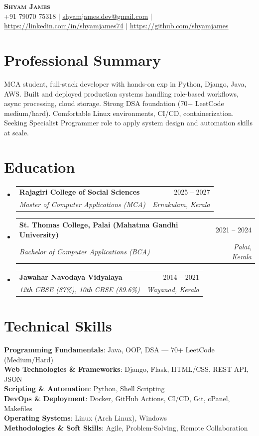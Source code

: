 \documentclass[a4paper,11pt]{article}
\makeatletter
\newcommand{\resumeSubheading}[4]{
  \vspace{-2pt}\item
    \begin{tabular*}{0.97\textwidth}[t]{l@{\extracolsep{\fill}}r}
      \textbf{#1} & #2 \\
      \textit{\small#3} & \textit{\small #4} \\
    \end{tabular*}\vspace{-7pt}
}
\newcommand{\resumeSubHeadingListStart}{\begin{itemize}[leftmargin=0.15in, label={}]}
\newcommand{\resumeSubHeadingListEnd}{\end{itemize}}
\makeatother
\begin{document}
\begin{center}
    \textbf{\Huge \scshape Shyam James} \\ \vspace{5pt}
    \small +91 79070 75318 $|$ \href{mailto:shyamjames.dev@gmail.com}{\underline{shyamjames.dev@gmail.com}} $|$ 
    \href{https://linkedin.com/in/shyamjames74}{\underline{https://linkedin.com/in/shyamjames74}} $|$
    \href{https://github.com/shyamjames}{\underline{https://github.com/shyamjames}}
\end{center}

\section{Professional Summary}
\vspace{2pt}
\small{MCA student, full-stack developer with hands-on exp in Python, Django, Java, AWS. Built and deployed production systems handling role-based workflows, async processing, cloud storage. Strong DSA foundation (70+ LeetCode medium/hard). Comfortable Linux environments, CI/CD, containerization. Seeking Specialist Programmer role to apply system design and automation skills at scale.}

\section{Education}
  \resumeSubHeadingListStart
    \resumeSubheading
      {Rajagiri College of Social Sciences}{2025 -- 2027}
      {Master of Computer Applications (MCA)}{Ernakulam, Kerala}
    \resumeSubheading
      {St. Thomas College, Palai (Mahatma Gandhi University)}{2021 -- 2024}
      {Bachelor of Computer Applications (BCA)}{Palai, Kerala}
    \resumeSubheading
      {Jawahar Navodaya Vidyalaya}{2014 -- 2021}
      {12th CBSE (87\%), 10th CBSE (89.6\%)}{Wayanad, Kerala}
  \resumeSubHeadingListEnd

\section{Technical Skills}
 \begin{itemize}[leftmargin=0.15in, label={}]
    \small{\item{
     \textbf{Programming Fundamentals}{: Java, OOP, DSA --- 70+ LeetCode (Medium/Hard)} \\
     \textbf{Web Technologies \& Frameworks}{: Django, Flask, HTML/CSS, REST API, JSON} \\
     \textbf{Scripting \& Automation}{: Python, Shell Scripting} \\
     \textbf{DevOps \& Deployment}{: Docker, GitHub Actions, CI/CD, Git, cPanel, Makefiles} \\
     \textbf{Operating Systems}{: Linux (Arch Linux), Windows} \\
     \textbf{Methodologies \& Soft Skills}{: Agile, Problem-Solving, Remote Collaboration} \\
    }}
 \end{itemize}
\end{document}
